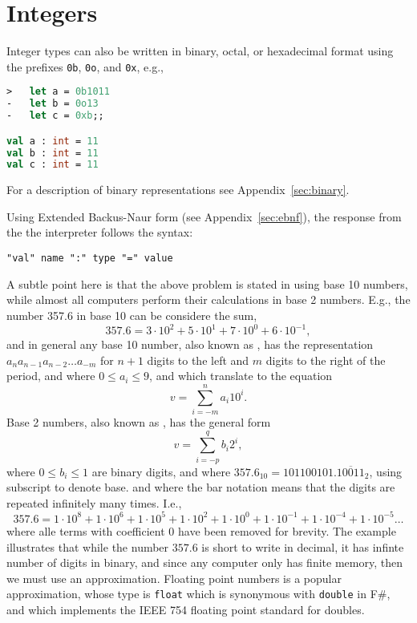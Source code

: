 \section{Integers}
Integer types can also be written in binary, octal, or hexadecimal format using the prefixes \verb|0b|, \verb|0o|, and \verb|0x|, e.g.,
\begin{lstlisting}[language=fsharp,caption={fsharpi}]
>   let a = 0b1011
-   let b = 0o13
-   let c = 0xb;;

val a : int = 11
val b : int = 11
val c : int = 11
\end{lstlisting}
For a description of binary representations see Appendix~\ref{sec:binary}.


 Using Extended Backus-Naur form (see Appendix~\ref{sec:ebnf}), the response from the the interpreter follows the syntax: 
\begin{lstlisting}[language=ebnf]
  "val" name ":" type "=" value
\end{lstlisting}

 A subtle point here is that the above problem is stated in using base 10 numbers, while almost all computers perform their calculations in base 2 numbers. E.g., the number 357.6 in base 10 can be considere the sum,
\begin{equation}
  357.6 = 3\cdot 10^2 + 5\cdot 10^1 + 7\cdot 10^0 + 6\cdot 10^{-1},
\end{equation}
and in general any base 10 number, also known as , has the representation $a_n a_{n-1} a_{n-2} \dots a_{-m}$ for $n+1$ digits to the left and $m$ digits to the right of the period, and where $0 \leq a_i \leq 9$, and which translate to the equation
\begin{equation}
  v = \sum_{i=-m}^{n} a_i10^i.
\end{equation}
Base 2 numbers, also known as , has the general form
\begin{equation}
  v = \sum_{i=-p}^{q} b_i2^i,
\end{equation}
where $0 \leq b_i \leq 1$ are binary digits, and where $357.6_{10} = 101100101.\overline{10011}_2$, using subscript to denote base. and where the bar notation means that the digits are repeated infinitely many times. I.e.,
\begin{equation}
  357.6 = 1\cdot 10^8  + 1\cdot 10^6 + 1\cdot 10^5 + 1\cdot 10^2 + 1\cdot 10^0 + 1\cdot 10^{-1} + 1\cdot 10^{-4} + 1\cdot 10^{-5}\dots 
\end{equation}
where alle terms with coefficient 0 have been removed for brevity. The example illustrates that while the number $357.6$ is short to write in decimal, it has infinte number of digits in binary, and since any computer only has finite memory, then we must use an approximation. Floating point numbers is a popular approximation, whose type is \lstinline|float| which is synonymous with \lstinline|double| in F\#, and which implements the IEEE 754 floating point standard for doubles. 





